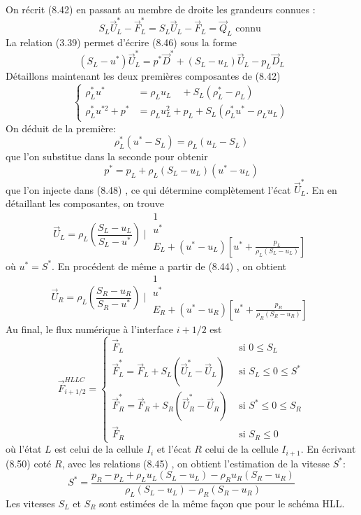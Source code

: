 On récrit (8.42) en passant au membre de droite les grandeurs connues :
$$
S_{L} \vec{U}_{L}^{*}-\vec{F}_{L}^{*}=S_{L} \vec{U}_{L}-\vec{F}_{L}=\vec{Q}_{L} \text { connu }
$$
La relation (3.39) permet d'écrire (8.46) sous la forme
$$
\left(S_{L}-u^{*}\right) \vec{U}_{L}^{*}=p^{*} \vec{D}^{*}+\left(S_{L}-u_{L}\right) \vec{U}_{L}-p_{L} \vec{D}_{L}
$$
Détaillons maintenant les deux premières composantes de (8.42)
$$
\left\{\begin{aligned}
\rho_{L}^{*} u^{*} &=\rho_{L} u_{L} \quad+S_{L}\left(\rho_{L}^{*}-\rho_{L}\right) \\
\rho_{L}^{*} u^{* 2}+p^{*} &=\rho_{L} u_{L}^{2}+p_{L}+S_{L}\left(\rho_{L}^{*} u^{*}-\rho_{L} u_{L}\right)
\end{aligned}\right.
$$
On déduit de la première:
$$
\rho_{L}^{*}\left(u^{*}-S_{L}\right)=\rho_{L}\left(u_{L}-S_{L}\right)
$$
que l'on substitue dans la seconde pour obtenir
$$
p^{*}=p_{L}+\rho_{L}\left(S_{L}-u_{L}\right)\left(u^{*}-u_{L}\right)
$$
que l'on injecte dans (8.48) , ce qui détermine complètement l'écat $\vec{U}_{L}^{*}$. En en détaillant les composantes, on trouve
$$
\vec{U}_{L}=\rho_{L}\left(\frac{S_{L}-u_{L}}{S_{L}-u^{*}}\right) \mid \begin{array}{l}
1 \\
u^{*} \\
E_{L}+\left(u^{*}-u_{L}\right)\left[u^{*}+\frac{p_{L}}{\rho_{L}\left(S_{L}-u_{L}\right)}\right]
\end{array}
$$
où $u^{*}=S^{*}$. En procédent de même a partir de (8.44) , on obtient
$$
\vec{U}_{R}=\rho_{L}\left(\frac{S_{R}-u_{R}}{S_{R}-u^{*}}\right) \mid \begin{array}{l}
1 \\
u^{*} \\
E_{R}+\left(u^{*}-u_{R}\right)\left[u^{*}+\frac{p_{R}}{\rho_{R}\left(S_{R}-u_{R}\right)}\right]
\end{array}
$$
Au final, le flux numérique à l'interface $i+1 / 2$ est
$$
\vec{F}_{i+1 / 2}^{H L L C}=\left\{\begin{array}{ll}
\vec{F}_{L} & \text { si } 0 \leq S_{L} \\
\vec{F}_{L}^{*}=\vec{F}_{L}+S_{L}\left(\vec{U}_{L}^{*}-\vec{U}_{L}\right) & \text { si } S_{L} \leq 0 \leq S^{*} \\
\vec{F}_{R}^{*}=\vec{F}_{R}+S_{R}\left(\vec{U}_{R}^{*}-\vec{U}_{R}\right) & \text { si } S^{*} \leq 0 \leq S_{R} \\
\vec{F}_{R} & \text { si } S_{R} \leq 0
\end{array}\right.
$$
où l'état $L$ est celui de la cellule $I_{i}$ et l'écat $R$ celui de la cellule $I_{i+1}$.
En écrivant (8.50) coté $R$, avec les relations (8.45) , on obtient l'estimation de la vitesse $S^{*}:$
$$
S^{*}=\frac{p_{R}-p_{L}+\rho_{L} u_{L}\left(S_{L}-u_{L}\right)-\rho_{R} u_{R}\left(S_{R}-u_{R}\right)}{\rho_{L}\left(S_{L}-u_{L}\right)-\rho_{R}\left(S_{R}-u_{R}\right)}
$$
Les vitesses $S_{L}$ et $S_{R}$ sont estimées de la même façon que pour le schéma HLL.

